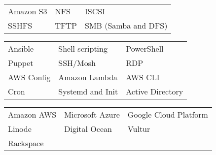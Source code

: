 \documentclass[a4paper,12pt]{memoir} %
\begin{document}

{\begin{tabular}{p{} p{} p{}}
	\bluebullet Amazon S3        & \bluebullet NFS               & \bluebullet ISCSI                  \\
	\bluebullet SSHFS            & \bluebullet TFTP              & \bluebullet SMB (Samba and DFS)    \\
\end{tabular}}


{\begin{tabular}{p{} p{} p{}}
	\bluebullet Ansible          & \bluebullet Shell scripting  & \bluebullet PowerShell               \\
	\bluebullet Puppet           & \bluebullet SSH/Mosh         & \bluebullet RDP                     \\
	\bluebullet AWS Config       & \bluebullet Amazon Lambda    & \bluebullet AWS CLI                 \\
	\bluebullet Cron             & \bluebullet Systemd and Init & \bluebullet Active Directory        \\
\end{tabular}}


\clearpage %

\userinformation %

\framebreak %


{\begin{tabular}{p{} p{} p{}}
	\bluebullet Amazon AWS       & \bluebullet Microsoft Azure  & \bluebullet Google Cloud Platform   \\
	\bluebullet Linode           & \bluebullet Digital Ocean    & \bluebullet Vultur                  \\
	\bluebullet Rackspace \\
\end{tabular}}
\end{document}
